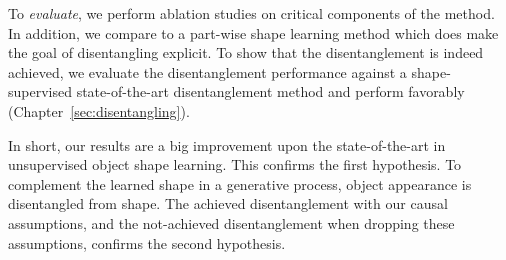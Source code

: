 	To \textit{evaluate}, we perform ablation studies on critical components of the method. In addition, we compare to a part-wise shape learning method which does make the goal of disentangling explicit.
	To show that the disentanglement is indeed achieved, we evaluate the disentanglement performance against a shape-supervised state-of-the-art disentanglement method and perform favorably (Chapter~\ref{sec:disentangling}).


	In short, our results are a big improvement upon the state-of-the-art in unsupervised object shape learning. This confirms the first hypothesis. To complement the learned shape in a generative process, object appearance is disentangled from shape. The achieved disentanglement with our causal assumptions, and the not-achieved disentanglement when dropping these assumptions, confirms the second hypothesis.
